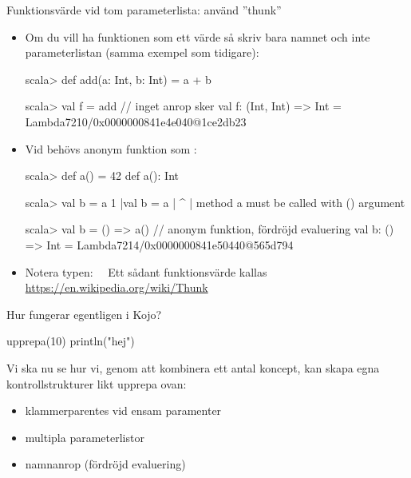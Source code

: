 \begin{Slide}{Funktionsvärde vid tom parameterlista: använd ''thunk''}\SlideFontSmall
\begin{itemize}\SlideFontSmall

\item Om du vill ha funktionen som ett värde så skriv bara namnet och inte parameterlistan (samma exempel som tidigare):
\begin{REPLsmall}
scala> def add(a: Int, b: Int) = a + b

scala> val f = add     // inget anrop sker 
val f: (Int, Int) => Int = Lambda7210/0x0000000841e4e040@1ce2db23
\end{REPLsmall}

\item Vid  behövs anonym funktion som : 
\begin{REPLsmall}
scala> def a() = 42
def a(): Int

scala> val b = a
1 |val b = a
  |        ^
  |        method a must be called with () argument

scala> val b = () => a()   // anonym funktion, fördröjd evaluering
val b: () => Int = Lambda7214/0x0000000841e50440@565d794
\end{REPLsmall}
\item Notera typen:  ~~Ett sådant funktionsvärde kallas \\ \url{https://en.wikipedia.org/wiki/Thunk} 
\end{itemize}
\end{Slide}




\begin{Slide}{Hur fungerar egentligen  i Kojo?}
\begin{Code}[basicstyle=\ttfamily\SlideFontSize{14}{16}]
upprepa(10) {
  println("hej")
}
\end{Code}

\pause
Vi ska nu se hur vi, genom att kombinera ett antal koncept, kan skapa egna kontrollstrukturer likt upprepa ovan:
\begin{itemize}
\item klammerparentes vid ensam paramenter
\item multipla parameterlistor
\item namnanrop (fördröjd evaluering)
\end{itemize}
\end{Slide}



